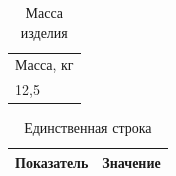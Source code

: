 \begin{table}
  \caption{Масса изделия}
  \begin{tabular}{l} %
    \hline
    Масса, кг \\
    12,5 \\
    \hline
  \end{tabular}
\end{table}

\begin{table}
  \caption{Единственная строка}
  \begin{tabular}{ll} %
    \hline
    Показатель & Значение \\
    \hline
  \end{tabular}
\end{table}
